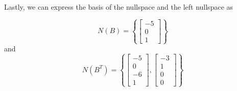 Lastly, we can express the basis of the nullspace and the left nullspace as
\begin{mdframed}[style=MyFrame]
    \begin{equation}
        N(B) = 
        \left\{
        \begin{bmatrix}
            -5      \\
            0       \\
            1
        \end{bmatrix}
        \right\}
    \end{equation}
    and 
    \begin{equation}
        N(B^{T}) = 
        \left\{
        \begin{bmatrix}
            -5      \\
            0       \\
            -6      \\
            1
        \end{bmatrix},
        \begin{bmatrix}
            -3      \\
            1       \\
            0       \\
            0
        \end{bmatrix}
        \right\}
    \end{equation}
\end{mdframed}
